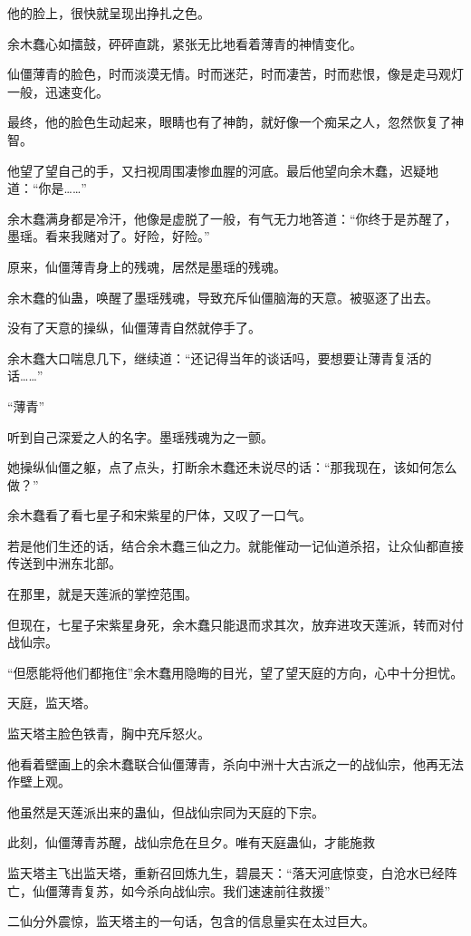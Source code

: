 \begin{this_body}
他的脸上，很快就呈现出挣扎之色。

余木蠢心如擂鼓，砰砰直跳，紧张无比地看着薄青的神情变化。

仙僵薄青的脸色，时而淡漠无情。时而迷茫，时而凄苦，时而悲恨，像是走马观灯一般，迅速变化。

最终，他的脸色生动起来，眼睛也有了神韵，就好像一个痴呆之人，忽然恢复了神智。

他望了望自己的手，又扫视周围凄惨血腥的河底。最后他望向余木蠢，迟疑地道：“你是……”

余木蠢满身都是冷汗，他像是虚脱了一般，有气无力地答道：“你终于是苏醒了，墨瑶。看来我赌对了。好险，好险。”

原来，仙僵薄青身上的残魂，居然是墨瑶的残魂。

余木蠢的仙蛊，唤醒了墨瑶残魂，导致充斥仙僵脑海的天意。被驱逐了出去。

没有了天意的操纵，仙僵薄青自然就停手了。

余木蠢大口喘息几下，继续道：“还记得当年的谈话吗，要想要让薄青复活的话……”

“薄青”

听到自己深爱之人的名字。墨瑶残魂为之一颤。

她操纵仙僵之躯，点了点头，打断余木蠢还未说尽的话：“那我现在，该如何怎么做？”

余木蠢看了看七星子和宋紫星的尸体，又叹了一口气。

若是他们生还的话，结合余木蠢三仙之力。就能催动一记仙道杀招，让众仙都直接传送到中洲东北部。

在那里，就是天莲派的掌控范围。

但现在，七星子宋紫星身死，余木蠢只能退而求其次，放弃进攻天莲派，转而对付战仙宗。

“但愿能将他们都拖住”余木蠢用隐晦的目光，望了望天庭的方向，心中十分担忧。

天庭，监天塔。

监天塔主脸色铁青，胸中充斥怒火。

他看着壁画上的余木蠢联合仙僵薄青，杀向中洲十大古派之一的战仙宗，他再无法作壁上观。

他虽然是天莲派出来的蛊仙，但战仙宗同为天庭的下宗。

此刻，仙僵薄青苏醒，战仙宗危在旦夕。唯有天庭蛊仙，才能施救

监天塔主飞出监天塔，重新召回炼九生，碧晨天：“落天河底惊变，白沧水已经阵亡，仙僵薄青复苏，如今杀向战仙宗。我们速速前往救援”

二仙分外震惊，监天塔主的一句话，包含的信息量实在太过巨大。


\end{this_body}
